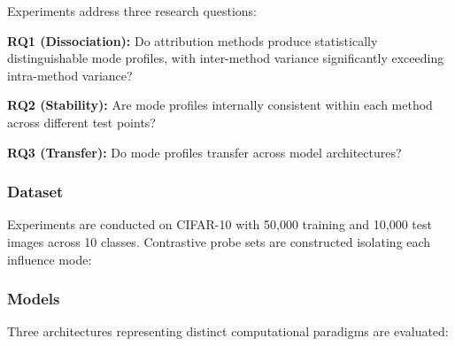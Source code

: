 
Experiments address three research questions:

\textbf{RQ1 (Dissociation):} Do attribution methods produce statistically distinguishable mode profiles, with inter-method variance significantly exceeding intra-method variance?

\textbf{RQ2 (Stability):} Are mode profiles internally consistent within each method across different test points?

\textbf{RQ3 (Transfer):} Do mode profiles transfer across model architectures?

\subsubsection{Dataset}

Experiments are conducted on CIFAR-10 with 50,000 training and 10,000 test images across 10 classes. Contrastive probe sets are constructed isolating each influence mode:

\begin{table}[htbp]
\centering
{}
\end{table}

\subsubsection{Models}

Three architectures representing distinct computational paradigms are evaluated:

\begin{table}[htbp]
\centering
{}
\end{table}

